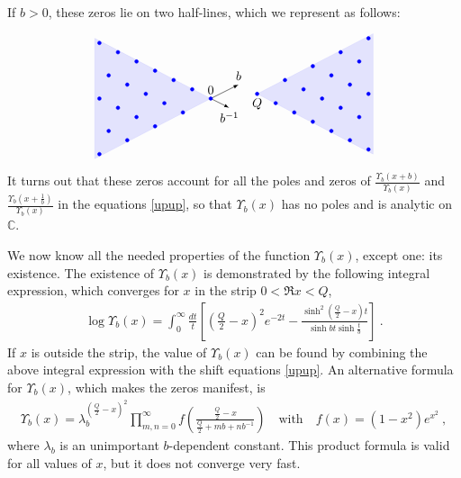 \documentclass[12pt,a4paper,notitlepage]{report}
\numberwithin{equation}{section}
\theoremstyle{break}
\begin{document}
If $b>0$, these zeros lie on two half-lines, which we represent as follows:
\begin{align}
\begin{tikzpicture}[scale = 1.3, baseline=(current  bounding  box.center)]
\node[above] at (0, 0) {$0$};
\node[below] at (1, .1) {$Q$};
\draw [latex-latex] (.6, .3) node[above] {$b$} -- (0, 0) -- (.4, -.2) node[below] {$b^{-1}$};
\begin{scope}[rotate = 90]
\filldraw[blue, opacity = .1] (0,0) -- (-1.3, 2.5) -- (1.3, 2.5) -- cycle;
\clip (-1.4, -.2) -- (1.4, -.2) -- (1.4, 2.5) -- (-1.4, 2.5) -- cycle;
\foreach \x in {0, 1,...,4}{
  \foreach \y in {0, 1,...,6}{
    \node[draw,circle,inner sep=1pt,fill,blue] at (-.3*\x +.2*\y, .6*\x +.4*\y) {};
  }}
  \end{scope}
\begin{scope}[shift = {(1, .1)}, rotate = -90]
\filldraw[blue, opacity = .1] (0,0) -- (-1.3, 2.5) -- (1.3, 2.5) -- cycle;
\clip (-1.4, -.2) -- (1.4, -.2) -- (1.4, 2.5) -- (-1.4, 2.5) -- cycle;
\foreach \x in {0, 1,...,4}{
  \foreach \y in {0, 1,...,6}{
    \node[draw,circle,inner sep=1pt,fill,blue] at (-.3*\x +.2*\y, .6*\x +.4*\y) {};
  }}  
\end{scope}  
 \end{tikzpicture}
\label{lines}
\end{align}
It turns out that these zeros account for all the poles and zeros of $\frac{\Upsilon_b(x+b)}{\Upsilon_b(x)}$ and $\frac{\Upsilon_b(x+\frac{1}{b})}{\Upsilon_b(x)}$ in the equations \eqref{upup}, so that $\Upsilon_b(x)$ has no poles and is analytic on ${\mathbb{C}}$. 

We now know all the needed properties of the function $\Upsilon_b(x)$, except one: its existence.
The existence of $\Upsilon_b(x)$ is demonstrated by the following integral expression, which converges for $x$ in the strip $0<\Re x<Q$, 
\begin{align}
 \log\Upsilon_b(x) = \int_0^\infty \frac{dt}{t} \left[\left(\tfrac{Q}{2}-x\right)^2 e^{-2t} -\frac{\sinh^2\left(\frac{Q}{2}-x\right)t}{\sinh bt\sinh\frac{t}{b}}\right]\ .
\label{lup}
\end{align}
If $x$ is outside the strip, the value of $\Upsilon_b(x)$ can be found by combining the above integral expression with the shift equations \eqref{upup}.
An alternative formula for $\Upsilon_b(x)$, which makes the zeros manifest, is 
\begin{align}
 \Upsilon_b(x) = \lambda_b^{(\frac{Q}{2}-x)^2}\prod_{m,n=0}^\infty f\left(\frac{\frac{Q}{2}-x}{\frac{Q}{2}+mb+nb^{-1}}\right) \quad \text{with} \quad f(x)=(1-x^2)e^{x^2}\ ,
\end{align}
where $\lambda_b$ is an unimportant $b$-dependent constant.
This product formula is valid for all values of $x$, but it does not converge very fast.
\end{document}
